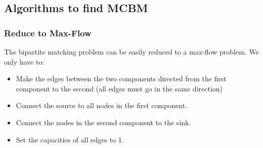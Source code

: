 \subsection{Algorithms to find MCBM}
\subsubsection{Reduce to Max-Flow}
The bipartite matching problem can be easily reduced to a max-flow problem.
We only have to:
\begin{itemize}
		\setlength{\itemsep}{0pt}
		\item Make the edges between the two components directed from the 
				first component to the second (all edges must go in the 
				same direction)
		\item Connect the source to all nodes in the first component.
		\item Connect the nodes in the second component to the sink.
		\item Set the capacities of all edges to 1.
\end{itemize}


